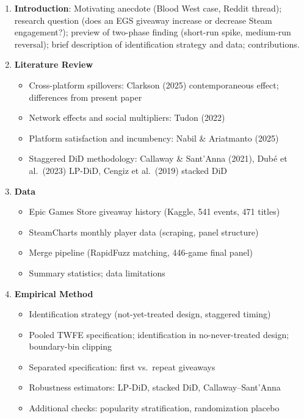 \documentclass[11pt]{article}
\begin{document}
\begin{enumerate}[leftmargin=2em]
  \item \textbf{Introduction}: Motivating anecdote (Blood West case, Reddit thread);
    research question (does an EGS giveaway increase or decrease Steam engagement?);
    preview of two-phase finding (short-run spike, medium-run reversal); brief
    description of identification strategy and data; contributions.

  \item \textbf{Literature Review}
    \begin{itemize}
      \item Cross-platform spillovers: Clarkson (2025) contemporaneous effect;
        differences from present paper
      \item Network effects and social multipliers: Tudon (2022)
      \item Platform satisfaction and incumbency: Nabil \& Ariatmanto (2025)
      \item Staggered DiD methodology: Callaway \& Sant'Anna (2021),
        Dub\'e et al.\ (2023) LP-DiD, Cengiz et al.\ (2019) stacked DiD
    \end{itemize}

  \item \textbf{Data}
    \begin{itemize}
      \item Epic Games Store giveaway history (Kaggle, 541 events, 471 titles)
      \item SteamCharts monthly player data (scraping, panel structure)
      \item Merge pipeline (RapidFuzz matching, 446-game final panel)
      \item Summary statistics; data limitations
    \end{itemize}

  \item \textbf{Empirical Method}
    \begin{itemize}
      \item Identification strategy (not-yet-treated design, staggered timing)
      \item Pooled TWFE specification; identification in no-never-treated design;
        boundary-bin clipping
      \item Separated specification: first vs.\ repeat giveaways
      \item Robustness estimators: LP-DiD, stacked DiD, Callaway--Sant'Anna
      \item Additional checks: popularity stratification, randomization placebo
    \end{itemize}


\end{enumerate}
\end{document}
